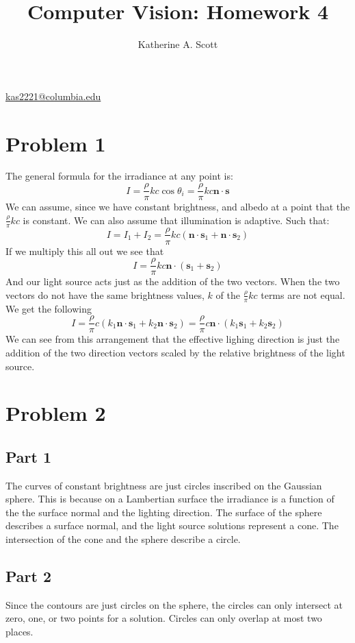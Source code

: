 \documentclass{article}
\begin{document}
\title{Computer Vision: Homework 4}

\author{Katherine A. Scott}
\maketitle
\mbox{}
\begin{center}
\href{mailto:katherineAScott@gmail.com}{kas2221@columbia.edu}

\end{center}
\section{Problem 1}
The general formula for the irradiance at any point is:
\[
I=\frac{\rho}{\pi}kc\cos{\theta_i}=\frac{\rho}{\pi}kc\textbf{n}\cdot\textbf{s}
\]
We can assume, since we have constant brightness, and albedo at a
point that the $\frac{\rho}{\pi}kc$ is constant. We can also assume
that illumination is adaptive. Such that:
\[
I = I_1+I_2 = \frac{\rho}{\pi}kc(\textbf{n} \cdot \textbf{s}_1 + \textbf{n} \cdot
\textbf{s}_2) 
\]
If we multiply this all out we see that 
\[
I = \frac{\rho}{\pi}kc \textbf{n} \cdot (\textbf{s}_1+\textbf{s}_2)
\] 
And our light source acts just as the addition of the two
vectors. When the two vectors do not have the same brightness values,
$k$ of the $\frac{\rho}{\pi}kc$ terms are not equal. We get the
following 
\[
I=\frac{\rho}{\pi}c(k_1\textbf{n} \cdot \textbf{s}_1+
k_2\textbf{n} \cdot \textbf{s}_2)=\frac{\rho}{\pi}c\textbf{n}\cdot(k_1\textbf{s}_1+k_2\textbf{s}_2)
\]
We can see from this arrangement that the effective lighing direction
is just the addition of the two direction vectors scaled by the
relative brightness of the light source. 
\section{Problem 2}
\subsection{Part 1}
The curves of constant brightness are just circles inscribed on the
Gaussian sphere. This is because on a Lambertian surface the
irradiance is a function of the the surface normal and the lighting
direction. The surface of the sphere describes a surface normal, and
the light source solutions represent a cone. The intersection of the
cone and the sphere describe a circle.  
\subsection{Part 2}
Since the contours are just circles on the sphere, the circles can
only intersect at zero, one, or two points for a solution. Circles can only overlap
at most two places. 
\end{document}
